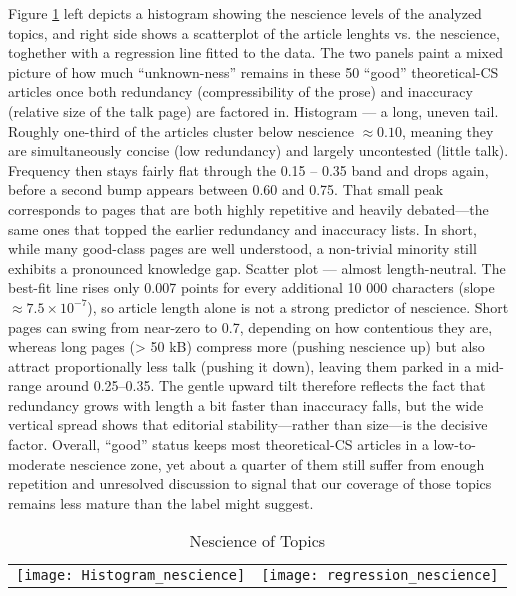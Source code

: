 Figure \ref{fig:Nescience-of-Topics} left depicts a histogram showing the nescience levels of the analyzed topics, and right side shows a scatterplot of the article lenghts vs. the nescience, toghether with a regression line fitted to the data. The two panels paint a mixed picture of how much “unknown-ness” remains in these 50 “good” theoretical-CS articles once both redundancy (compressibility of the prose) and inaccuracy (relative size of the talk page) are factored in. Histogram — a long, uneven tail. Roughly one-third of the articles cluster below nescience $\approx 0.10$, meaning they are simultaneously concise (low redundancy) and largely uncontested (little talk).  Frequency then stays fairly flat through the 0.15 – 0.35 band and drops again, before a second bump appears between 0.60 and 0.75.  That small peak corresponds to pages that are both highly repetitive and heavily debated—the same ones that topped the earlier redundancy and inaccuracy lists.  In short, while many good-class pages are well understood, a non-trivial minority still exhibits a pronounced knowledge gap. Scatter plot — almost length-neutral. The best-fit line rises only 0.007 points for every additional 10 000 characters (slope $\approx 7.5 \times 10^{-7}$), so article length alone is not a strong predictor of nescience.  Short pages can swing from near-zero to 0.7, depending on how contentious they are, whereas long pages (> 50 kB) compress more (pushing nescience up) but also attract proportionally less talk (pushing it down), leaving them parked in a mid-range around 0.25–0.35.  The gentle upward tilt therefore reflects the fact that redundancy grows with length a bit faster than inaccuracy falls, but the wide vertical spread shows that editorial stability—rather than size—is the decisive factor. Overall, “good” status keeps most theoretical-CS articles in a low-to-moderate nescience zone, yet about a quarter of them still suffer from enough repetition and unresolved discussion to signal that our coverage of those topics remains less mature than the label might suggest.

\begin{table}
\begin{centering}
\begin{tabular}{c c}
\texttt{[image: Histogram\_nescience]}
&
\texttt{[image: regression\_nescience]}\tabularnewline
\end{tabular}
\par\end{centering}
\caption{\label{fig:Nescience-of-Topics}Nescience of Topics}
\end{table}

